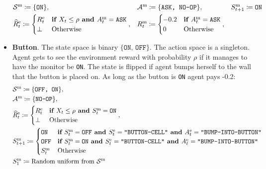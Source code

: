 \begin{itemize}[leftmargin=*]
    \begin{align*}
        &\mathcal{S}^\text{m} \coloneq \{\texttt{ON}\}, && \mathcal{A}^\text{m} \coloneq \{\texttt{ASK, NO-OP}\}, && S^\text{m}_{t + 1} \coloneqq \texttt{ON} \\
        & \widehat{R}^\text{e}_t \coloneq 
        \begin{cases}
        R^\text{e}_t & \textbf{if } X_t \leq \rho \textbf{ and } A^\text{m}_t = \texttt{ASK}\\
        \bot & \text{Otherwise}
        \end{cases},
        && R^\text{m}_t \coloneq 
        \begin{cases}
        -0.2 & \textbf{if } A^\text{m}_t = \texttt{ASK}\\
        0 & \text{Otherwise}
        \end{cases},
    \end{align*}
    \item \textbf{Button}. The state space is binary $\{\texttt{ON, OFF}\}$. The action space is a singleton. Agent gets to see the environment reward with probability $\rho$ if it manages to have the monitor be \texttt{ON}. The state is flipped if agent bumps herself to the wall that the button is placed on. As long as the button is \texttt{ON} agent pays -0.2:
    \begin{align*}
        &\mon{\c{S}} \coloneq \{\texttt{OFF, ON}\}, \\
        & \mon{\c{A}} \coloneq \{\texttt{NO-OP}\}, \\
        & \env{\widehat{R}}_t \coloneq 
        \begin{cases}
        \env{R}_t & \textbf{if } X_t \leq \rho \textbf{ and } \mon{S}_t = \texttt{ON} \\
        \bot & \text{Otherwise}
        \end{cases},
        \\
        & \mon{S}_{t + 1} \coloneq 
        \begin{cases}
            \texttt{ON} & \textbf{if } \mon{S}_t = \texttt{OFF} \textbf{ and } \env{S}_t = \texttt{"BUTTON-CELL"} \textbf{ and } \env{A}_t = \texttt{"BUMP-INTO-BUTTON"}\\
            \texttt{OFF} & \textbf{if } \mon{S}_t = \texttt{ON} \textbf{ and } \env{S}_t = \texttt{"BUTTON-CELL"} \textbf{ and } \env{A}_t = \texttt{"BUMP-INTO-BUTTON"}\\
            \mon{S}_t & \text{Otherwise}
        \end{cases} \\
        & \mon{S}_{1} \coloneqq  \text{Random uniform from } \mon{\c{S}} \\

\end{align*}
\end{itemize}
